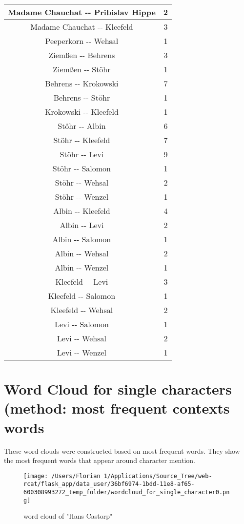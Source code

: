 \documentclass{article}%
\begin{document}
\begin{tabular}{|c|c|}
\hline%
Madame Chauchat {-}{-} Pribislav Hippe&2\\%
\hline%
Madame Chauchat {-}{-} Kleefeld&3\\%
\hline%
Peeperkorn {-}{-} Wehsal&1\\%
\hline%
Ziemßen {-}{-} Behrens&3\\%
\hline%
Ziemßen {-}{-} Stöhr&1\\%
\hline%
Behrens {-}{-} Krokowski&7\\%
\hline%
Behrens {-}{-} Stöhr&1\\%
\hline%
Krokowski {-}{-} Kleefeld&1\\%
\hline%
Stöhr {-}{-} Albin&6\\%
\hline%
Stöhr {-}{-} Kleefeld&7\\%
\hline%
Stöhr {-}{-} Levi&9\\%
\hline%
Stöhr {-}{-} Salomon&1\\%
\hline%
Stöhr {-}{-} Wehsal&2\\%
\hline%
Stöhr {-}{-} Wenzel&1\\%
\hline%
Albin {-}{-} Kleefeld&4\\%
\hline%
Albin {-}{-} Levi&2\\%
\hline%
Albin {-}{-} Salomon&1\\%
\hline%
Albin {-}{-} Wehsal&2\\%
\hline%
Albin {-}{-} Wenzel&1\\%
\hline%
Kleefeld {-}{-} Levi&3\\%
\hline%
Kleefeld {-}{-} Salomon&1\\%
\hline%
Kleefeld {-}{-} Wehsal&2\\%
\hline%
Levi {-}{-} Salomon&1\\%
\hline%
Levi {-}{-} Wehsal&2\\%
\hline%
Levi {-}{-} Wenzel&1\\%
\hline%
\end{tabular}

%
\section{Word Cloud for single characters (method: most frequent contexts words}%
These word clouds were constructed based on most frequent words. They show the most frequent words that appear around character mention. %


\begin{figure}[H]%
\centering%
\texttt{[image: /Users/Florian 1/Applications/Source\_Tree/web-rcat/flask\_app/data\_user/36bf6974-1bdd-11e8-af65-600308993272\_temp\_folder/wordcloud\_for\_single\_character0.png]}%
\caption{word cloud of "Hans Castorp"}%
\end{figure}
\end{document}
